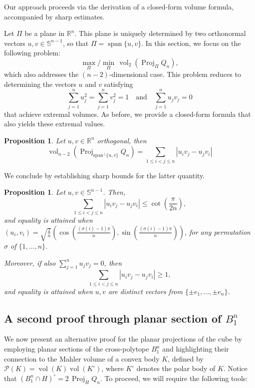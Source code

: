 \documentclass[10pt]{amsart}
\newcommand{\ls}{\leqslant}
\newcommand{\gr}{\geqslant}
\newcommand{\1}{\textbf{1}}
\numberwithin{equation}{section} %
\newtheorem{proposition}[theorem]{Proposition}
\theoremstyle{remark}
\theoremstyle{definition}
\begin{document}
Our approach proceeds via the derivation of a closed-form volume formula, accompanied by sharp estimates.


Let $\Pi$ be a plane in $\mathbb{R}^n$. This plane is uniquely determined by two orthonormal vectors $u, v \in \mathbb{S}^{n-1}$, so that $\Pi = \operatorname{span}\{u, v\}$. In this section, we focus on the following problem:
\[
\max_{\Pi} / \min_{\Pi} \, \operatorname{vol}_2(\operatorname{Proj}_{\Pi} Q_n),
\]
which also addresses the $(n-2)$-dimensional case. This problem reduces to determining the vectors $u$ and $v$ satisfying
\[
\sum_{j=1}^n u_j^2 = \sum_{j=1}^n v_j^2 = 1 \quad \text{and} \quad \sum_{j=1}^n u_j v_j = 0
\]
that achieve extremal volumes. As before, we provide a closed-form formula that also yields these extremal values.

 
\begin{proposition}\label{formula for planar cube}
Let  $u,v\in \mathbb{R}^{n}$ orthogonal, then  
\[
\operatorname{vol}_{n-2}(\operatorname{Proj}_{\text{span}^{\perp}\{u,v\} }Q_n)=\sum_{1\ls i<j\ls n}|u_iv_j-u_j v_i|
\]
\end{proposition}


We conclude by establishing sharp bounds for the latter quantity.
\begin{proposition}\label{bound planar cube}
Let $u,v\in \mathbb{S}^{n-1}$. Then,
\[
 \sum_{1\ls i<j\ls n} |u_iv_j-u_jv_i|\ls \cot\left( \frac{\pi}{2n}\right),
\]
and equality is attained when $(u_i,v_i)=\sqrt{\frac{2}{n}} \left(\cos\left(\frac{ (\sigma(i)-1)\pi}{n} \right),\sin \left(\frac{(\sigma(i)-1)\pi}{n} \right) \right)$, for any permutation $\sigma$ of $\{ 1,\ldots,n\}$.

Moreover, if also  $\sum_{j=1}^n u_jv_j=0$, then 
\[
 \sum_{1\ls i<j\ls n} |u_iv_j-u_jv_i| \gr1,
\]
and equality is attained when $u,v$ are distinct vectors from $\{\pm e_1,\ldots, \pm e_n \}$.
\end{proposition}




\subsection{A second proof through planar section of $B_1^n$}
We now present an alternative proof for the planar projections of the cube by employing planar sections of the cross-polytope $B_1^n$ and highlighting their connection to the Mahler volume of a convex body $K$, defined by $\mathcal{P}(K)=\operatorname{vol}(K)\operatorname{vol}(K^{\circ})$, where $K^{\circ}$ denotes the polar body of $K$. Notice that $\left( B_1^n \cap H \right)^{\circ} = 2\,\operatorname{Proj}_{H} Q_n .$
To proceed, we will require the following tools:
\end{document}

